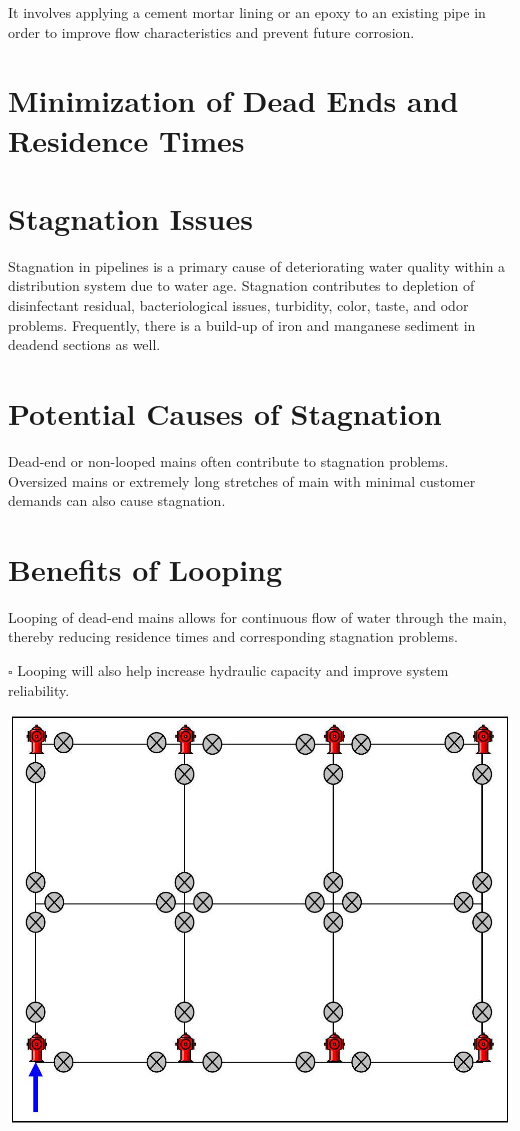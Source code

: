 \documentclass[10pt]{article}
\begin{document}
It involves applying a cement mortar lining or an epoxy to an existing pipe in order to improve flow characteristics and prevent future corrosion.

\section{Minimization of Dead Ends and Residence Times}
\section{Stagnation Issues}
Stagnation in pipelines is a primary cause of deteriorating water quality within a distribution system due to water age. Stagnation contributes to depletion of disinfectant residual, bacteriological issues, turbidity, color, taste, and odor problems. Frequently, there is a build-up of iron and manganese sediment in deadend sections as well.

\section{Potential Causes of Stagnation}
Dead-end or non-looped mains often contribute to stagnation problems. Oversized mains or extremely long stretches of main with minimal customer demands can also cause stagnation.

\section{Benefits of Looping}
Looping of dead-end mains allows for continuous flow of water through the main, thereby reducing residence times and corresponding stagnation problems.

$\square$ Looping will also help increase hydraulic capacity and improve system reliability.

\includegraphics[max width=\textwidth]{LoopedDistributionSystem}
\end{document}
